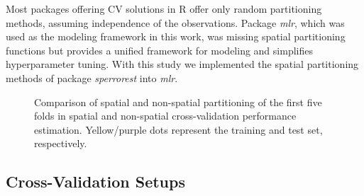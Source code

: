 \documentclass[review]{elsarticle}
\begin{document}
Most packages offering \ac{CV} solutions in R offer only random partitioning methods, assuming independence of the observations.
Package \textit{mlr}, which was used as the modeling framework in this work, was missing spatial partitioning functions but provides a unified framework for modeling and simplifies hyperparameter tuning.
With this study we implemented the spatial partitioning methods of package \textit{sperrorest} into \textit{mlr}.

\begin{figure} [t!]
	\begin{center}
		\caption[]{Comparison of spatial and non-spatial partitioning of the first five folds in spatial and non-spatial cross-validation performance estimation.
			Yellow/purple dots represent the training and test set, respectively.}
		\label{fig:cv_settings_comparison}
	\end{center}
\end{figure}

\subsection{Cross-Validation Setups}
\end{document}
